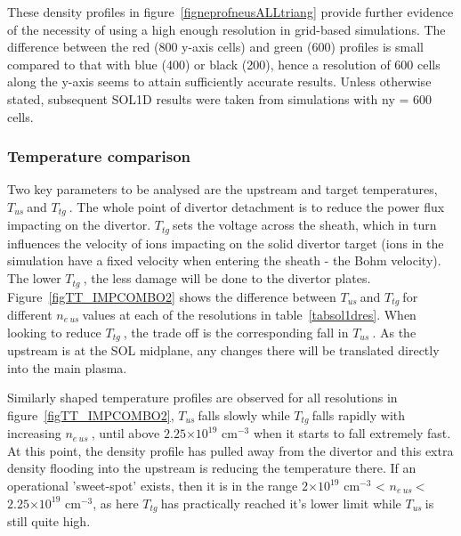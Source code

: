 \documentclass[11pt]{article}  %
\providecommand{\e}[1]{\ensuremath{\times 10^{#1}}} %
\providecommand{\neus}{$n_{e~us}~$} %
\providecommand{\Tus}{$T_{us}~$} %
\providecommand{\Ttg}{$T_{tg}~$} %
\begin{document}
These density profiles in figure~\ref{figneprofneusALLtriang} provide further evidence of the necessity of using a high enough resolution in grid-based simulations. The difference between the red (800 y-axis cells) and green (600) profiles is small compared to that with blue (400) or black (200), hence a resolution of 600 cells along the y-axis seems to attain sufficiently accurate results. Unless otherwise stated, subsequent SOL1D results were taken from simulations with ny = 600 cells.

\subsubsection{Temperature comparison}\label{sssectempcomp}
Two key parameters to be analysed are the upstream and target temperatures, \Tus and \Ttg. The whole point of divertor detachment is to reduce the power flux impacting on the divertor. \Ttg sets the voltage across the sheath, which in turn influences the velocity of ions impacting on the solid divertor target (ions in the simulation have a fixed velocity when entering the sheath - the Bohm velocity). The lower \Ttg, the less damage will be done to the divertor plates. Figure~\ref{figTT_IMPCOMBO2} shows the difference between \Tus and \Ttg for different \neus values at each of the resolutions in table~\ref{tabsol1dres}. When looking to reduce \Ttg, the trade off is the corresponding fall in \Tus. As the upstream is at the SOL midplane, any changes there will be translated directly into the main plasma. 

Similarly shaped temperature profiles are observed for all resolutions in figure~\ref{figTT_IMPCOMBO2}, \Tus falls slowly while \Ttg falls rapidly with increasing \neus, until above $2.25\e{19}$ cm$^{-3}$ when it starts to fall extremely fast. At this point, the density profile has pulled away from the divertor and this extra density flooding into the upstream is reducing the temperature there. If an operational 'sweet-spot' exists, then it is in the range $2\e{19}$ cm$^{-3}$ < \neus < $2.25\e{19}$ cm$^{-3}$, as here \Ttg has practically reached it's lower limit while \Tus is still quite high.
\end{document}
